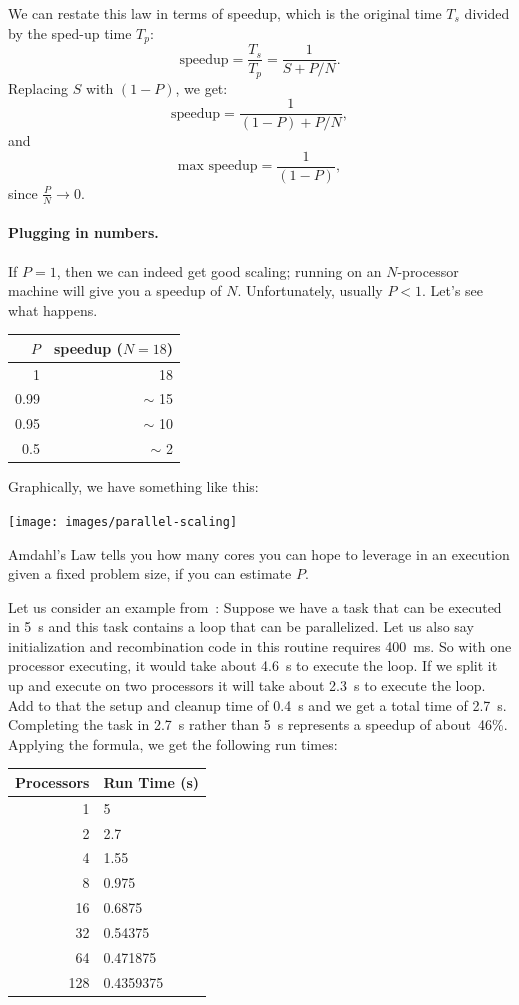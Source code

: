 We can restate this law in terms of speedup, which is the 
original time $T_s$ divided by the sped-up time $T_p$:
\[ \mbox{speedup} = \frac{T_s}{T_p} = \frac{1}{S+P/N}. \]
Replacing $S$ with $(1-P)$, we get:
\[ \mbox{speedup} = \frac{1}{(1-P)+P/N}, \]
and
\[ \mbox{max speedup} = \frac{1}{(1-P)}, \]
since $\frac{P}{N} \rightarrow 0$.

\paragraph{Plugging in numbers.} If $P = 1$, then we can indeed get good
scaling; running on an $N$-processor machine will give you a speedup
of $N$. Unfortunately, usually $P < 1$.  Let's see what happens.

\begin{center}
\begin{tabular}{r|r}
$P$ & speedup ($N=18$) \\ \hline
1 & 18 \\
0.99 & $\sim$ 15 \\
0.95 & $\sim$ 10 \\
0.5 & $\sim$ 2
\end{tabular}
\end{center}
Graphically, we have something like this:
\begin{center}
  \texttt{[image: images/parallel-scaling]}
\end{center}


Amdahl's Law tells you how many cores you can hope to leverage in an
execution given a fixed problem size, if you can estimate $P$.

Let us consider an example from~\cite{mte241}: Suppose we have a task that can be executed in 5~s and this task contains a loop that can be parallelized. Let us also say initialization and recombination code in this routine requires 400~ms. So with one processor executing, it would take about 4.6~s to execute the loop. If we split it up and execute on two processors it will take about 2.3~s to execute the loop. Add to that the setup and cleanup time of 0.4~s and we get a total time of 2.7~s. Completing the task in 2.7~s rather than 5~s represents a speedup of about~46\%. Applying the formula, we get the following run times:

\begin{center}
	\begin{tabular}{r|l}
	\textbf{Processors} & \textbf{Run Time (s)} \\ \hline
	1 & 5\\
	2 & 2.7\\
	4 & 1.55\\
	8 & 0.975\\
	16 & 0.6875 \\
	32 & 0.54375 \\
	64 & 0.471875 \\
	128 & 0.4359375\\
	\end{tabular}
\end{center}

